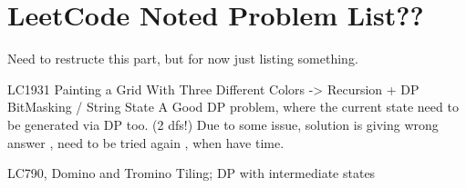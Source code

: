 \chapter{LeetCode Noted Problem List??}\label{chp:PraticeList?}


Need to restructe this part, but for now just listing something.

\begin{compactenum}
    \item LC1931 Painting a Grid With Three Different Colors -> Recursion + DP BitMasking / String State
    A Good DP problem, where the current state need to be generated via DP too. (2 dfs!)
    Due to some issue, solution is giving wrong answer , need to be tried again , when have time.

    \item LC790, Domino and Tromino Tiling;  DP with intermediate states
\end{compactenum}
